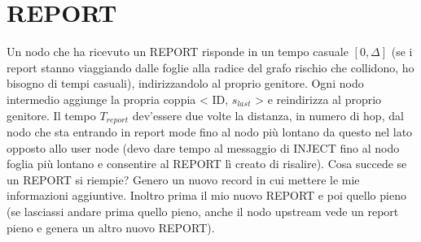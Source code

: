 \documentclass[12pt,italian]{report}
\begin{document}
\section{REPORT}
Un nodo che ha ricevuto un REPORT risponde in un tempo casuale $[0, \Delta]$ (se i report stanno viaggiando dalle foglie alla radice del grafo rischio che collidono, ho bisogno di tempi casuali), indirizzandolo al proprio genitore. Ogni nodo intermedio aggiunge la propria coppia < ID, $s_{last}$ > e reindirizza al proprio genitore. 
\bigbreak
\noindent Il tempo $T_{report}$ dev'essere due volte la distanza, in numero di hop, dal nodo che sta entrando in report mode fino al nodo più lontano da questo nel lato opposto allo user node (devo dare tempo al messaggio di INJECT fino al nodo foglia più lontano e consentire al REPORT lì creato di risalire). 
\bigbreak
\noindent Cosa succede se un REPORT si riempie? Genero un nuovo record in cui mettere le mie informazioni aggiuntive. Inoltro prima il mio nuovo REPORT e poi quello pieno (se lasciassi andare prima quello pieno, anche il nodo upstream vede un report pieno e genera un altro nuovo REPORT). 
\end{document}

